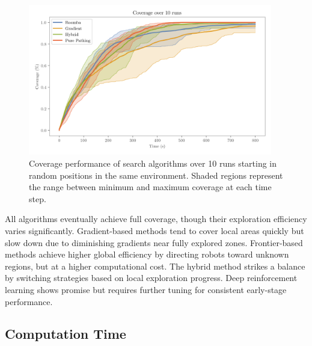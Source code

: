 \begin{figure}[H]
    \begin{center}
        \includegraphics[width=0.95\textwidth]{./figures/plots/benchmarks/coverage-over-10-runs.png}
    \end{center}
    \caption{Coverage performance of search algorithms over 10 runs starting in random positions in the same environment. Shaded regions represent the range between minimum and maximum coverage at each time step.}
    \label{fig:coverage-benchmark}
\end{figure}

All algorithms eventually achieve full coverage, though their exploration efficiency varies significantly. 
Gradient-based methods tend to cover local areas quickly but slow down due to diminishing gradients near fully explored zones. 
Frontier-based methods achieve higher global efficiency by directing robots toward unknown regions, but at a higher computational cost. The hybrid method strikes a balance by switching strategies based on local exploration progress. 
Deep reinforcement learning shows promise but requires further tuning for consistent early-stage performance.

\subsection{Computation Time}
